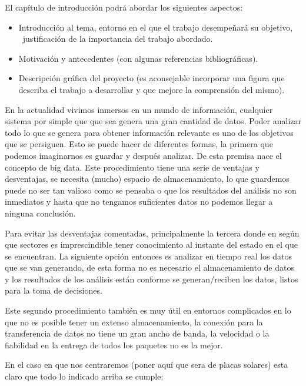 \documentclass[a4paper]{article}
\newcommand\liststyleWWNumxxix{%
\renewcommand\labelitemi{{}-}
\renewcommand\labelitemii{o}
\renewcommand\labelitemiii{[F0A7?]}
\renewcommand\labelitemiv{[F0B7?]}
}
\begin{document}
El cap\'itulo de introducci\'on podr\'a abordar los siguientes aspectos:

\liststyleWWNumxxix
\begin{itemize}
\item Introducci\'on al tema, entorno en el que el trabajo desempe\~nar\'a su objetivo, \ justificaci\'on de la
importancia del trabajo abordado.
\item Motivaci\'on y antecedentes (con algunas referencias bibliogr\'aficas).
\item Descripci\'on gr\'afica del proyecto (es aconsejable incorporar una figura que describa el trabajo a desarrollar y
que mejore la comprensi\'on del mismo).
\end{itemize}

En la actualidad vivimos inmersos en un mundo de información, cualquier sistema por simple que que sea genera una gran cantidad de datos. Poder analizar todo lo que se genera para obtener información relevante es uno de los objetivos que se persiguen. Esto se puede hacer de diferentes formas, la primera que podemos imaginarnos es guardar y después analizar. De esta premisa nace el concepto de big data. Este procedimiento tiene una serie de ventajas y desventajas, se necesita (mucho) espacio de  almacenamiento, lo que guardemos puede no ser tan valioso como se pensaba o que los resultados del análisis no son inmediatos y hasta que no tengamos suficientes datos no podemos llegar a ninguna conclusión.

Para evitar las desventajas comentadas, principalmente la tercera donde en según que sectores es imprescindible tener conocimiento al instante del estado en el que se encuentran. La siguiente opción entonces es analizar en tiempo real los datos que se van generando, de esta forma no es necesario el almacenamiento de datos y los resultados de los análisis están conforme se generan/reciben los datos, listos para la toma de decisiones.

Este segundo procedimiento también es muy útil en entornos complicados en lo que no es posible tener un extenso almacenamiento, la conexión para la transferencia de datos no tiene un gran ancho de banda, la velocidad o la fiabilidad en la entrega de todos los paquetes no es la mejor.

En el caso en que nos centraremos (poner aquí que sera de placas solares) esta claro que todo lo indicado arriba se cumple:
\end{document}
